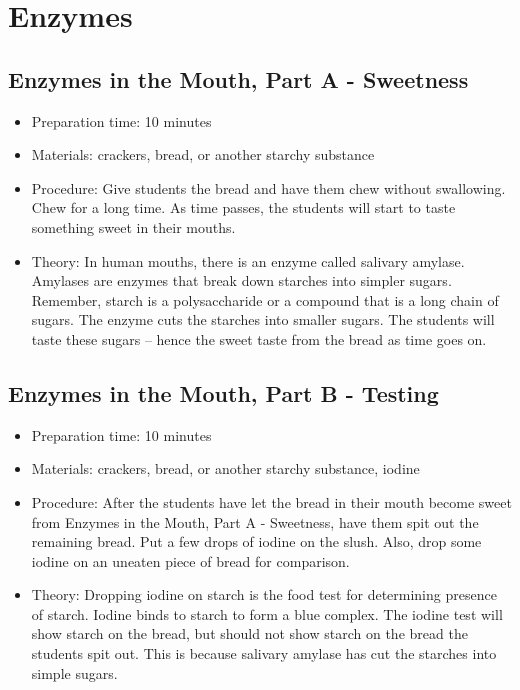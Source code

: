 \section{Enzymes}
\subsection{Enzymes in the Mouth, Part A - Sweetness}
\begin{itemize}
\item{Preparation time: 10 minutes}
\item{Materials: crackers, bread, or another starchy substance}
\item{Procedure: Give students the bread and have them chew without swallowing. Chew for a long time. As time passes, the students will start to taste something sweet in their mouths.}
\item{Theory: In human mouths, there is an enzyme called salivary amylase. Amylases are enzymes that break down starches into simpler sugars. Remember, starch is a polysaccharide or a compound that is a long chain of sugars. The enzyme cuts the starches into smaller sugars. The students will taste these sugars – hence the sweet taste from the bread as time goes on.}
\end{itemize}

\subsection{Enzymes in the Mouth, Part B - Testing}
\begin{itemize}
\item{Preparation time: 10 minutes}
\item{Materials: crackers, bread, or another starchy substance, iodine}
\item{Procedure: After the students have let the bread in their mouth become sweet from Enzymes in the Mouth, Part A - Sweetness, have them spit out the remaining bread. Put a few drops of iodine on the slush. Also, drop some iodine on an uneaten piece of bread for comparison.}
\item{Theory: Dropping iodine on starch is the food test for determining presence of starch. Iodine binds to starch to form a blue complex. The iodine test will show starch on the bread, but should not show starch on the bread the students spit out. This is because salivary amylase has cut the starches into simple sugars.}
\end{itemize}

